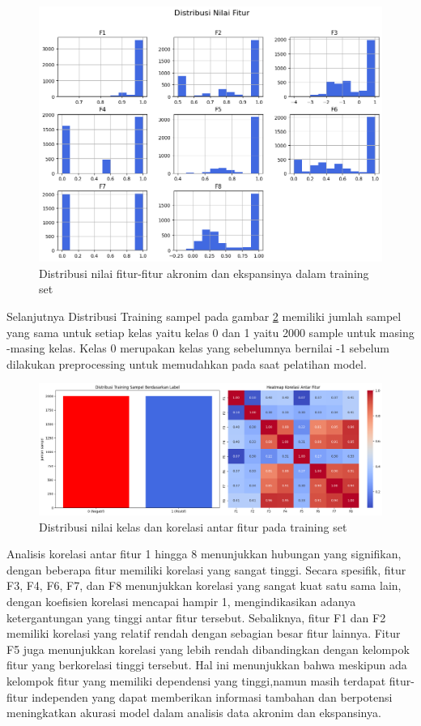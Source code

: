 \documentclass{article}\usepackage{float}
\begin{document}
\begin{figure}
\centering
\includegraphics[width=1\linewidth]{img/dist_fitur.png}
\caption{\label{fig:Dist_Feature}Distribusi nilai fitur-fitur akronim dan ekspansinya dalam training set}
\end{figure}

Selanjutnya Distribusi Training sampel pada gambar \ref{fig:Dist_Label} memiliki jumlah sampel yang sama untuk setiap kelas yaitu kelas 0 dan 1 yaitu 2000 sample untuk masing -masing kelas. Kelas 0 merupakan kelas yang sebelumnya bernilai -1 sebelum dilakukan preprocessing untuk memudahkan pada saat pelatihan model.


\begin{figure}
\centering
\includegraphics[width=1\linewidth]{img/dist_label.png}
\caption{\label{fig:Dist_Label}Distribusi nilai kelas dan korelasi antar fitur pada training set}
\end{figure}


Analisis korelasi antar fitur 1 hingga 8 menunjukkan hubungan yang signifikan, dengan beberapa fitur memiliki korelasi yang sangat tinggi. Secara spesifik, fitur F3, F4, F6, F7, dan F8 menunjukkan korelasi yang sangat kuat satu sama lain, dengan koefisien korelasi mencapai hampir 1, mengindikasikan adanya ketergantungan yang tinggi antar fitur tersebut. Sebaliknya, fitur F1 dan F2 memiliki korelasi yang relatif rendah dengan sebagian besar fitur lainnya. Fitur F5 juga menunjukkan korelasi yang lebih rendah dibandingkan dengan kelompok fitur yang berkorelasi tinggi tersebut. Hal ini menunjukkan bahwa meskipun ada kelompok fitur yang memiliki dependensi yang tinggi,namun masih terdapat fitur-fitur independen yang dapat memberikan informasi tambahan dan berpotensi meningkatkan akurasi model dalam analisis data akronim dan ekspansinya. 
\end{document}

